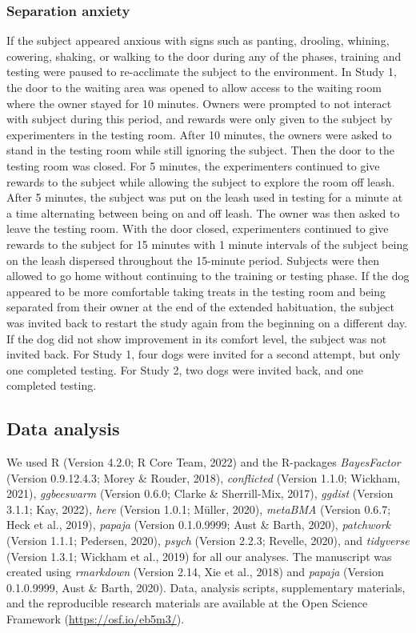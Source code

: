 \documentclass[
  pub,floatsintext]{apa6}
\begin{document}
\hypertarget{separation-anxiety}{%
\subsubsection{Separation anxiety}\label{separation-anxiety}}

If the subject appeared anxious with signs such as panting, drooling, whining, cowering, shaking, or walking to the door during any of the phases, training and testing were paused to re-acclimate the subject to the environment. In Study 1, the door to the waiting area was opened to allow access to the waiting room where the owner stayed for 10 minutes. Owners were prompted to not interact with subject during this period, and rewards were only given to the subject by experimenters in the testing room. After 10 minutes, the owners were asked to stand in the testing room while still ignoring the subject. Then the door to the testing room was closed. For 5 minutes, the experimenters continued to give rewards to the subject while allowing the subject to explore the room off leash. After 5 minutes, the subject was put on the leash used in testing for a minute at a time alternating between being on and off leash. The owner was then asked to leave the testing room. With the door closed, experimenters continued to give rewards to the subject for 15 minutes with 1 minute intervals of the subject being on the leash dispersed throughout the 15-minute period. Subjects were then allowed to go home without continuing to the training or testing phase. If the dog appeared to be more comfortable taking treats in the testing room and being separated from their owner at the end of the extended habituation, the subject was invited back to restart the study again from the beginning on a different day. If the dog did not show improvement in its comfort level, the subject was not invited back. For Study 1, four dogs were invited for a second attempt, but only one completed testing. For Study 2, two dogs were invited back, and one completed testing.

\hypertarget{data-analysis}{%
\subsection{Data analysis}\label{data-analysis}}

We used R (Version 4.2.0; R Core Team, 2022) and the R-packages \emph{BayesFactor} (Version 0.9.12.4.3; Morey \& Rouder, 2018), \emph{conflicted} (Version 1.1.0; Wickham, 2021), \emph{ggbeeswarm} (Version 0.6.0; Clarke \& Sherrill-Mix, 2017), \emph{ggdist} (Version 3.1.1; Kay, 2022), \emph{here} (Version 1.0.1; Müller, 2020), \emph{metaBMA} (Version 0.6.7; Heck et al., 2019), \emph{papaja} (Version 0.1.0.9999; Aust \& Barth, 2020), \emph{patchwork} (Version 1.1.1; Pedersen, 2020), \emph{psych} (Version 2.2.3; Revelle, 2020), and \emph{tidyverse} (Version 1.3.1; Wickham et al., 2019) for all our analyses. The manuscript was created using \emph{rmarkdown} (Version 2.14, Xie et al., 2018) and \emph{papaja} (Version 0.1.0.9999, Aust \& Barth, 2020). Data, analysis scripts, supplementary materials, and the reproducible research materials are available at the Open Science Framework (\url{https://osf.io/eb5m3/}).
\end{document}
